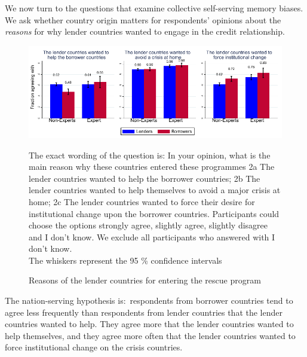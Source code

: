 We now turn to the questions that examine collective
self-serving memory biases. We ask whether country
origin matters for respondents' opinions about the \textit{reasons} for why lender countries wanted to engage in the credit relationship. 
\begin{figure}[h!]
\caption{Reasons of the lender countries for entering the rescue program}
    \begin{center}
    \includegraphics[scale=1.2]{graph2.pdf}
    \label{fig:Figure1}
    \end{center}
     \tiny
     \begin{tablenotes} 
    {The exact wording of the question is: In your opinion, what is the main reason why these countries entered these programmes 2a The lender countries wanted to help the borrower countries; 2b The lender countries wanted to help themselves to avoid a major crisis at home; 2c The lender countries wanted to force their desire for institutional change upon the borrower countries. Participants could choose the options strongly agree, slightly agree, slightly disagree and I don't know. We exclude all participants who answered with I don't know.\\
    The whiskers represent the 95 \% confidence intervals}
    \end{tablenotes}
\end{figure}

The nation-serving hypothesis is:\ respondents from borrower countries tend
to agree less frequently than respondents from lender countries 
that the lender countries wanted to help. They agree more that
the lender countries wanted to help themselves, and they agree more 
often that the lender countries wanted to force institutional change on the
crisis countries.\textit{\ }

